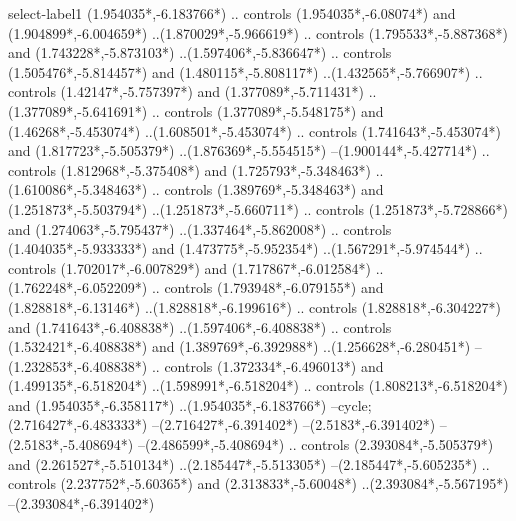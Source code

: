 {\begin{scope}[x=1mm,y=1mm,line width=\SCstroke mm,line cap=round,line join=round]
\begin{SCpart}{select-label1}
 ({1.954035*\SCF},{-6.183766*\SCF})
.. controls ({1.954035*\SCF},{-6.08074*\SCF}) and ({1.904899*\SCF},{-6.004659*\SCF}) ..({1.870029*\SCF},{-5.966619*\SCF})
.. controls ({1.795533*\SCF},{-5.887368*\SCF}) and ({1.743228*\SCF},{-5.873103*\SCF}) ..({1.597406*\SCF},{-5.836647*\SCF})
.. controls ({1.505476*\SCF},{-5.814457*\SCF}) and ({1.480115*\SCF},{-5.808117*\SCF}) ..({1.432565*\SCF},{-5.766907*\SCF})
.. controls ({1.42147*\SCF},{-5.757397*\SCF}) and ({1.377089*\SCF},{-5.711431*\SCF}) ..({1.377089*\SCF},{-5.641691*\SCF})
.. controls ({1.377089*\SCF},{-5.548175*\SCF}) and ({1.46268*\SCF},{-5.453074*\SCF}) ..({1.608501*\SCF},{-5.453074*\SCF})
.. controls ({1.741643*\SCF},{-5.453074*\SCF}) and ({1.817723*\SCF},{-5.505379*\SCF}) ..({1.876369*\SCF},{-5.554515*\SCF})
--({1.900144*\SCF},{-5.427714*\SCF})
.. controls ({1.812968*\SCF},{-5.375408*\SCF}) and ({1.725793*\SCF},{-5.348463*\SCF}) ..({1.610086*\SCF},{-5.348463*\SCF})
.. controls ({1.389769*\SCF},{-5.348463*\SCF}) and ({1.251873*\SCF},{-5.503794*\SCF}) ..({1.251873*\SCF},{-5.660711*\SCF})
.. controls ({1.251873*\SCF},{-5.728866*\SCF}) and ({1.274063*\SCF},{-5.795437*\SCF}) ..({1.337464*\SCF},{-5.862008*\SCF})
.. controls ({1.404035*\SCF},{-5.933333*\SCF}) and ({1.473775*\SCF},{-5.952354*\SCF}) ..({1.567291*\SCF},{-5.974544*\SCF})
.. controls ({1.702017*\SCF},{-6.007829*\SCF}) and ({1.717867*\SCF},{-6.012584*\SCF}) ..({1.762248*\SCF},{-6.052209*\SCF})
.. controls ({1.793948*\SCF},{-6.079155*\SCF}) and ({1.828818*\SCF},{-6.13146*\SCF}) ..({1.828818*\SCF},{-6.199616*\SCF})
.. controls ({1.828818*\SCF},{-6.304227*\SCF}) and ({1.741643*\SCF},{-6.408838*\SCF}) ..({1.597406*\SCF},{-6.408838*\SCF})
.. controls ({1.532421*\SCF},{-6.408838*\SCF}) and ({1.389769*\SCF},{-6.392988*\SCF}) ..({1.256628*\SCF},{-6.280451*\SCF})
--({1.232853*\SCF},{-6.408838*\SCF})
.. controls ({1.372334*\SCF},{-6.496013*\SCF}) and ({1.499135*\SCF},{-6.518204*\SCF}) ..({1.598991*\SCF},{-6.518204*\SCF})
.. controls ({1.808213*\SCF},{-6.518204*\SCF}) and ({1.954035*\SCF},{-6.358117*\SCF}) ..({1.954035*\SCF},{-6.183766*\SCF})
--cycle;
 ({2.716427*\SCF},{-6.483333*\SCF})
--({2.716427*\SCF},{-6.391402*\SCF})
--({2.5183*\SCF},{-6.391402*\SCF})
--({2.5183*\SCF},{-5.408694*\SCF})
--({2.486599*\SCF},{-5.408694*\SCF})
.. controls ({2.393084*\SCF},{-5.505379*\SCF}) and ({2.261527*\SCF},{-5.510134*\SCF}) ..({2.185447*\SCF},{-5.513305*\SCF})
--({2.185447*\SCF},{-5.605235*\SCF})
.. controls ({2.237752*\SCF},{-5.60365*\SCF}) and ({2.313833*\SCF},{-5.60048*\SCF}) ..({2.393084*\SCF},{-5.567195*\SCF})
--({2.393084*\SCF},{-6.391402*\SCF})

\end{SCpart}
\end{scope}}

